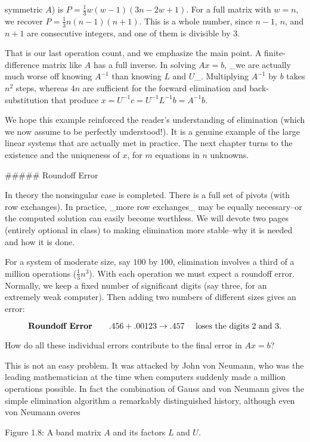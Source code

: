 symmetric \(A\)) is \(P=\frac{1}{3}w(w-1)(3n-2w+1)\). For a full matrix with \(w=n\), we recover \(P=\frac{1}{3}n(n-1)(n+1)\). This is a whole number, since \(n-1\), \(n\), and \(n+1\) are consecutive integers, and one of them is divisible by \(3\).

That is our last operation count, and we emphasize the main point. A finite-difference matrix like \(A\) has a full inverse. In solving \(Ax=b\), _we are actually much worse off knowing \(A^{-1}\) than knowing \(L\) and \(U\)_. Multiplying \(A^{-1}\) by \(b\) takes \(n^{2}\) steps, whereas \(4n\) are sufficient for the forward elimination and back-substitution that produce \(x=U^{-1}c=U^{-1}L^{-1}b=A^{-1}b\).

We hope this example reinforced the reader's understanding of elimination (which we now assume to be perfectly understood!). It is a genuine example of the large linear systems that are actually met in practice. The next chapter turns to the existence and the uniqueness of \(x\), for \(m\) equations in \(n\) unknowns.

##### Roundoff Error

In theory the nonsingular case is completed. There is a full set of pivots (with row exchanges). In practice, _more row exchanges_ may be equally necessary--or the computed solution can easily become worthless. We will devote two pages (entirely optional in class) to making elimination more stable--why it is needed and how it is done.

For a system of moderate size, say \(100\) by \(100\), elimination involves a third of a million operations (\(\frac{1}{3}n^{3}\)). With each operation we must expect a roundoff error. Normally, we keep a fixed number of significant digits (say three, for an extremely weak computer). Then adding two numbers of different sizes gives an error:

\[\mbox{\bf Roundoff Error}\qquad.456+.00123\rightarrow.457\quad\mbox{ loses the digits 2 and 3}.\]

How do all these individual errors contribute to the final error in \(Ax=b\)?

This is not an easy problem. It was attacked by John von Neumann, who was the leading mathematician at the time when computers suddenly made a million operations possible. In fact the combination of Gauss and von Neumann gives the simple elimination algorithm a remarkably distinguished history, although even von Neumann overes

Figure 1.8: A band matrix \(A\) and its factors \(L\) and \(U\).

 